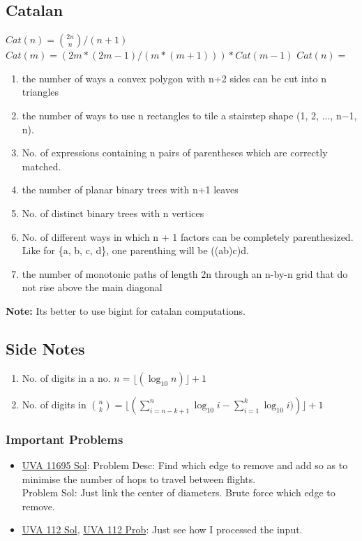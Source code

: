 \documentclass[8pt, a4paper, oneside, twocolumn]{extarticle}
\begin{document}
\subsection{Catalan}
$Cat(n) = \binom{2n}{n} / (n + 1)$
\\$Cat(m) = (2m*(2m - 1)/(m*(m + 1))) * Cat(m - 1)$
$Cat(n) = $\begin{enumerate}
    \item the number of ways a convex polygon with n+2 sides can be cut into n triangles
    \item the number of ways to use n rectangles to tile a stairstep shape (1, 2, ..., n−1, n).
    \item No. of expressions containing n pairs of parentheses which are correctly matched.
    \item the number of planar binary trees with n+1 leaves
    \item No. of distinct binary trees with n vertices
    \item No. of different ways in which n + 1 factors can be completely parenthesized. Like for \{a, b, c, d\}, one parenthing will be ((ab)c)d.
    \item the number of monotonic paths of length 2n through an n-by-n grid that do not rise above the main diagonal
\end{enumerate}
\textbf{Note: }Its better to use bigint for catalan computations.
\subsection{Side Notes}
\begin{enumerate}
    \item No. of digits in a no. $n = \lfloor(\log_{10}{n})\rfloor + 1$
    \item No. of digits in $\binom{n}{k} = \lfloor(\sum_{i = n - k + 1}^{n}\log_{10}{i} - \sum_{i = 1}^{k}\log_{10}{i)})\rfloor + 1$
\end{enumerate}
\subsubsection{Important Problems}
\begin{itemize}
	\item \href {https://gist.github.com/sourabh2311/6cff69fef833097556696bd6f31f3f1d}{UVA 11695 Sol}: Problem Desc: Find which edge to remove and add so as to minimise the number of hops to travel between flights.\\
	Problem Sol: Just link the center of diameters. Brute force which edge to remove. 
	\item \href {https://github.com/sourabh2311/Competitive-Programming/blob/master/UVA_112.cpp}{UVA 112 Sol}, \href {https://uva.onlinejudge.org/external/1/112.pdf}{UVA 112 Prob}: Just see how I processed the input.
\end{itemize}
\end{document}
